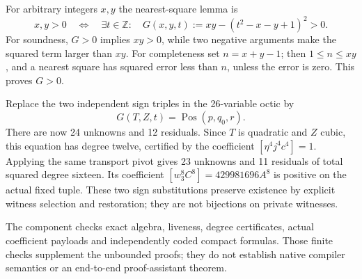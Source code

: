For arbitrary integers $x,y$ the nearest-square lemma is
\[
 x,y>0\quad\Longleftrightarrow\quad
 \exists t\in\mathbb Z:\quad
 G(x,y,t):=xy-(t^2-x-y+1)^2>0.
\]
For soundness, $G>0$ implies $xy>0$, while two negative arguments make
the squared term larger than $xy$. For completeness set $n=x+y-1$;
then $1\leq n\leq xy$, and a nearest square has squared error less than
$n$, unless the error is zero. This proves $G>0$.

Replace the two independent sign triples in the 26-variable octic by
\[
 G(T,Z,t)=\operatorname{Pos}(p,q_0,r).
\]
There are now 24 unknowns and 12 residuals. Since $T$ is quadratic and
$Z$ cubic, this equation has degree twelve, certified by the coefficient
$[\eta^4j^4c^4]=1$. Applying the same transport pivot gives 23 unknowns
and 11 residuals of total squared degree sixteen. Its coefficient
$[w_3^8C^8]=429981696A^8$ is positive on the actual fixed tuple.
These two sign substitutions preserve existence by explicit witness
selection and restoration; they are not bijections on private witnesses.

The component checks exact algebra, liveness, degree certificates, actual
coefficient payloads and independently coded compact formulas. Those finite
checks supplement the unbounded proofs; they do not establish native
compiler semantics or an end-to-end proof-assistant theorem.
